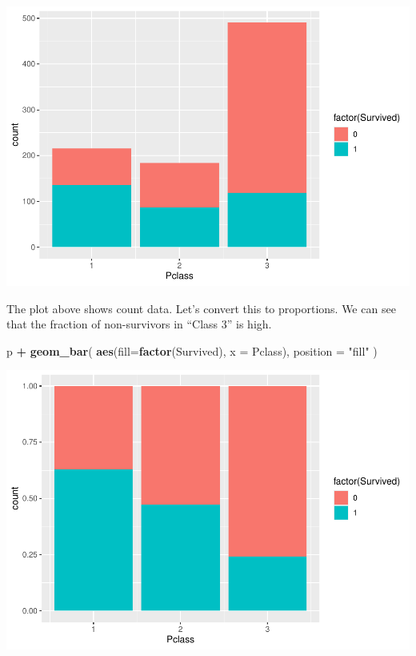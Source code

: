 \documentclass[
]{book}
\newenvironment{Shaded}{\begin{snugshade}}{\end{snugshade}}
\newcommand{\AttributeTok}[1]{\textcolor[rgb]{0.13,0.29,0.53}{#1}}
\newcommand{\FunctionTok}[1]{\textcolor[rgb]{0.13,0.29,0.53}{\textbf{#1}}}
\newcommand{\NormalTok}[1]{#1}
\newcommand{\SpecialCharTok}[1]{\textcolor[rgb]{0.81,0.36,0.00}{\textbf{#1}}}
\newcommand{\StringTok}[1]{\textcolor[rgb]{0.31,0.60,0.02}{#1}}
\begin{document}
\includegraphics{_main_files/figure-latex/barplot-1.pdf}

The plot above shows count data. Let's convert this to proportions. We can see that the fraction of non-survivors in ``Class 3'' is high.

\begin{Shaded}
\begin{Highlighting}[]
\NormalTok{p }\SpecialCharTok{+} \FunctionTok{geom\_bar}\NormalTok{(}
    \FunctionTok{aes}\NormalTok{(}\AttributeTok{fill=}\FunctionTok{factor}\NormalTok{(Survived), }\AttributeTok{x =}\NormalTok{ Pclass),}
    \AttributeTok{position =} \StringTok{"fill"}
\NormalTok{)}
\end{Highlighting}
\end{Shaded}

\includegraphics{_main_files/figure-latex/barplot2 -1.pdf}
\end{document}
